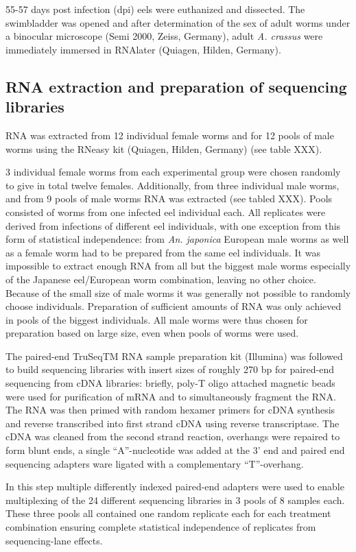 \documentclass[10pt]{article}
\begin{document}
55-57 days post infection (dpi) eels were euthanized and dissected.
The swimbladder was opened and after determination of the sex of adult
worms under a binocular microscope (Semi 2000, Zeiss, Germany), adult
\textit{A. crassus} were immediately immersed in RNAlater (Quiagen,
Hilden, Germany).

\subsection{RNA extraction and preparation of sequencing libraries}

RNA was extracted from 12 individual female worms and for 12 pools of
male worms using the RNeasy kit (Quiagen, Hilden, Germany) (see
table XXX).

3 individual female worms from each experimental group were chosen
randomly to give in total twelve females. Additionally, from three
individual male worms, and from 9 pools of male worms RNA was
extracted (see tabled XXX). Pools consisted of worms from one infected
eel individual each. All replicates were derived from infections of
different eel individuals, with one exception from this form of
statistical independence: from \textit{An. japonica} European male
worms as well as a female worm had to be prepared from the same eel
individuals. It was impossible to extract enough RNA from all but the
biggest male worms especially of the Japanese eel/European worm
combination, leaving no other choice. Because of the small size of
male worms it was generally not possible to randomly choose
individuals. Preparation of sufficient amounts of RNA was only
achieved in pools of the biggest individuals. All male worms were thus
chosen for preparation based on large size, even when pools of worms
were used.

The paired-end TruSeqTM RNA sample preparation kit (Illumina) was
followed to build sequencing libraries with insert sizes of roughly
270 bp for paired-end sequencing from cDNA libraries: briefly, poly-T
oligo attached magnetic beads were used for purification of mRNA and
to simultaneously fragment the RNA. The RNA was then primed with
random hexamer primers for cDNA synthesis and reverse transcribed into
first strand cDNA using reverse transcriptase. The cDNA was cleaned
from the second strand reaction, overhangs were repaired to form blunt
ends, a single ``A''-nucleotide was added at the 3' end and paired end
sequencing adapters ware ligated with a complementary
``T''-overhang. 

In this step multiple differently indexed paired-end adapters were
used to enable multiplexing of the 24 different sequencing libraries
in 3 pools of 8 samples each. These three pools all contained one
random replicate each for each treatment combination ensuring complete
statistical independence of replicates from sequencing-lane effects.
\end{document}

